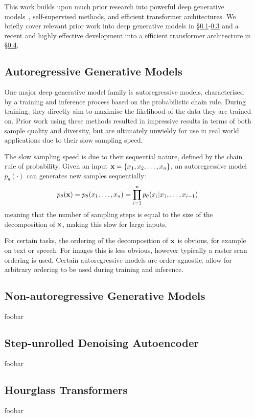 This work builds upon much prior research into powerful deep generative
models~\cite{bondtaylor2021review}, self-supervised methods, and efficient
transformer architectures. We briefly cover relevant prior work into deep
generative models in \S\ref{subsec:agm}-\ref{subsec:sundae} and a recent and
highly effective development into a efficient transformer architecture in
\S\ref{subsec:hourglass}.

\subsection{Autoregressive Generative Models}
\label{subsec:agm}
One major deep generative model family is autoregressive models, characterised
by a training and inference process based on the probabilistic chain rule.
During training, they directly aim to maximise the likelihood of the data they
are trained on. Prior work using these methods resulted in impressive results in
terms of both sample quality and diversity, but are ultimately unwieldy for use
in real world applications due to their slow sampling speed.

The slow sampling speed is due to their sequential nature, defined by the chain
rule of probability. Given an input $\mathbf{x} = \{ x_{1}, x_{2}, \dots,
x_{n} \}$, an autoregressive model $p_\theta(\cdot)$ can generates new
samples sequentially:
\begin{equation}\label{eq:ar}
    p_\theta(\mathbf{x}) = p_\theta(x_{1}, \dots, x_{n}) =
    \prod\limits^{n}_{i=1} p_\theta(x_{i} \vert x_{1}, \dots, x_{i-1})
\end{equation}
meaning that the number of sampling steps is equal to the size of the
decomposition of $\mathbf{x}$, making this slow for large inputs.

For certain tasks, the ordering of the decomposition of $\mathbf{x}$ is obvious, for
example on text or speech. For images this is less obvious, however typically a
raster scan ordering is used. Certain autoregressive models are order-agnostic,
allow for arbitrary ordering to be used during training and inference.

\subsection{Non-autoregressive Generative Models}
\label{subsec:nagm}
foobar

\subsection{Step-unrolled Denoising Autoencoder}
\label{subsec:sundae}
foobar

\subsection{Hourglass Transformers}
\label{subsec:hourglass}
foobar
